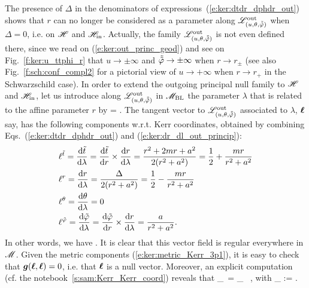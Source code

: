 The presence of $\Delta$ in the denominators of expressions~(\ref{e:ker:dtdr_dphdr_out})
shows that $r$ can no longer be considered as
a parameter along $\mathscr{L}^{\rm out}_{(u,\theta,\tilde{{\tilde\varphi}})}$ when
$\Delta=0$, i.e. on $\mathscr{H}$ and $\mathscr{H}_{\rm in}$. Actually, the family $\mathscr{L}^{\rm out}_{(u,\theta,\tilde{{\tilde\varphi}})}$ is not even defined there, since we read on
(\ref{e:ker:out_princ_geod}) and see on Fig.~\ref{f:ker:u_ttphi_r} that
$u\to\pm\infty$ and $\tilde{{\tilde\varphi}}\to \pm\infty$ when $r\to r_\pm$ (see also
Fig.~\ref{f:sch:conf_compl2} for a pictorial view of $u\to+\infty$ when $r\to r_+$ in the Schwarzschild case).
In order to extend the outgoing principal null family to $\mathscr{H}$ and $\mathscr{H}_{\rm in}$,
let us introduce
along $\mathscr{L}^{\rm out}_{(u,\theta,\tilde{{\tilde\varphi}})}$ in $\mathscr{M}_{\rm BL}$ the parameter $\lambda$
that is related to the affine parameter $r$ by
\be \label{e:ker:dr_dl_out_princip}
     =  .
\ee
The tangent vector to $\mathscr{L}^{\rm out}_{(u,\theta,\tilde{{\tilde\varphi}})}$ associated
to $\lambda$, $\bm{\ell}$ say, has the following components w.r.t. Kerr coordinates, obtained
by combining Eqs.~(\ref{e:ker:dtdr_dphdr_out}) and (\ref{e:ker:dr_dl_out_princip}):
\begin{align}
& \ell^{{\tilde t}} = \frac{\mathrm{d} {\tilde t}}{\mathrm{d}\lambda} = \frac{\mathrm{d} {\tilde t}}{\mathrm{d} r}\times\frac{\mathrm{d} r}{\mathrm{d}\lambda}
    = \frac{r^2 + 2m r + a^2}{2(r^2+a^2)} = \frac{1}{2} + \frac{m r}{r^2 + a^2} \nonumber \\
& \ell^{r} = \frac{\mathrm{d} r}{\mathrm{d}\lambda} = \frac{\Delta}{2(r^2+a^2)} = \frac{1}{2} - \frac{m r}{r^2 + a^2}\nonumber \\
& \ell^{\theta} = \frac{\mathrm{d} \theta}{\mathrm{d}\lambda} = 0 \nonumber\\
& \ell^{{\tilde\varphi}} = \frac{\mathrm{d} {\tilde\varphi}}{\mathrm{d}\lambda} = \frac{\mathrm{d} {\tilde\varphi}}{\mathrm{d} r}\times\frac{\mathrm{d} r}{\mathrm{d}\lambda}
    = \frac{a}{r^2+a^2} . \nonumber
\end{align}
In other words, we have
\be \label{e:ker:def_ell_outgoing}
     .
\ee
It is clear that this vector field is regular everywhere in $\mathscr{M}$.
Given the metric components (\ref{e:ker:metric_Kerr_3p1}), it is easy
to check that $\bm{g}(\bm{\ell},\bm{\ell})=0$, i.e. that $\bm{\ell}$ is a null vector.
Moreover, an explicit computation (cf. the notebook~\ref{s:sam:Kerr_Kerr_coord}) reveals that
\be \label{e:ker:pregeod_ell}
    \wnab_{\wl}\, \wl = \kappa_{\wl} \, \wl ,
\ee
with
\be \label{e:ker:bar_kappa}
    \kappa_{\wl} :=  .
